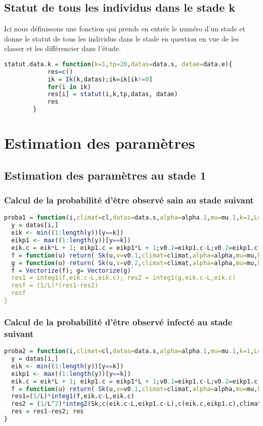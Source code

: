 \documentclass[12pt,a4paper]{scrbook}
\begin{document}
		\section{Statut de tous les individus dans le stade k}
Ici nous définissons une fonction qui prends en entrée le numéro d'un stade et donne le statut de tous les individus dans le stade en question en vue de les classer et les différencier dans l'étude.
		\begin{lstlisting}[language=R]
		statut.data.k = function(k=1,tp=20,datas=data.s, datae=data.e){
			res=c()
			ik = Ik(k,datas);ik=ik[ik!=0]
			for(i in ik)
			res[i] = statut(i,k,tp,datas, datae)
			res
		}
		\end{lstlisting}
	\chapter{Estimation des paramètres}
	\section{Estimation des paramètres au stade 1}
		\subsection{Calcul de la probabilité d'être observé sain au stade suivant}
	\begin{lstlisting}[language=R]
  proba1 = function(i,climat=cl,datas=data.s,alpha=alpha.1,mu=mu.1,k=1,L=7,w0k=w0.1){
  y = datas[i,]
  eik <- min((1:length(y))[y==k]) 
  eikp1 <- max((1:length(y))[y==k]) 
  eik.c = eik*L + 1; eikp1.c = eikp1*L + 1;v0.1=eikp1.c-L;v0.2=eikp1.c
  f = function(u) return( Sk(u,v=v0.1,climat=climat,alpha=alpha,mu=mu,k=k,w0k=w0k) )    
  g = function(u) return( Sk(u,v=v0.2,climat=climat,alpha=alpha,mu=mu,k=k,w0k=w0k) )
  f = Vectorize(f); g= Vectorize(g)`
  res1 = integ1(f,eik.c-L,eik.c); res2 = integ1(g,eik.c-L,eik.c)
  resf = (1/L)*(res1-res2)
  resf
}
	\end{lstlisting}
	\subsection{Calcul de la probabilité d'être observé infecté au stade suivant}
	\begin{lstlisting}[language=R]
	proba2 = function(i,climat=cl,datas=data.s,alpha=alpha.1,mu=mu.1,k=1,L=7,w0k=w0.1){
  y = datas[i,]
  eik <- min((1:length(y))[y==k]) 
  eikp1 <- max((1:length(y))[y==k]) 
  eik.c = eik*L + 1; eikp1.c = eikp1*L + 1;v0.1=eikp1.c-L;v0.2=eikp1.c
  f = function(u) return( Sk(u,v=v0.1,climat=climat,alpha=alpha,mu=mu,k=k,w0k=w0k) ); f = Vectorize(f)
  res1=(1/L)*integ1(f,eik.c-L,eik.c)
  res2 = (1/L^2)*integ2(Sk,c(eik.c-L,eikp1.c-L),c(eik.c,eikp1.c),climat,alpha,mu,k,w0k)
  res = res1-res2; res
}
    \end{lstlisting}
\end{document}
